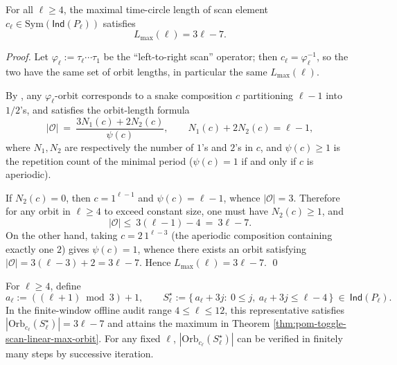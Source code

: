 \begin{theorem}\label{thm:pom-toggle-scan-linear-max-orbit}
For all \(\ell\ge 4\), the maximal time-circle length of scan element \(c_\ell\in\mathrm{Sym}(\mathsf{Ind}(P_\ell))\) satisfies
\[
L_{\max}(\ell)=3\ell-7.
\]
\end{theorem}
\begin{proof}
Let \(\varphi_\ell:=\tau_\ell\cdots\tau_1\) be the ``left-to-right scan'' operator; then \(c_\ell=\varphi_\ell^{-1}\), so the two have the same set of orbit lengths, in particular the same \(L_{\max}(\ell)\).

By \cite[Def.~4.1 \& Prop.~4.3]{JosephRoby2018TogglingIndependentSetsPath}, any \(\varphi_\ell\)-orbit corresponds to a snake composition \(c\) partitioning \(\ell-1\) into \(1/2\)'s, and satisfies the orbit-length formula
\[
|\mathcal O|
\ =\
\frac{3N_1(c)+2N_2(c)}{\psi(c)},
\qquad
N_1(c)+2N_2(c)=\ell-1,
\]
where \(N_1,N_2\) are respectively the number of \(1\)'s and \(2\)'s in \(c\), and \(\psi(c)\ge 1\) is the repetition count of the minimal period (\(\psi(c)=1\) if and only if \(c\) is aperiodic).

If \(N_2(c)=0\), then \(c=1^{\ell-1}\) and \(\psi(c)=\ell-1\), whence \(|\mathcal O|=3\).
Therefore for any orbit in \(\ell\ge 4\) to exceed constant size, one must have \(N_2(c)\ge 1\), and
\[
|\mathcal O|
\le\
3(\ell-1)-4
\ =\
3\ell-7.
\]
On the other hand, taking \(c=2\,1^{\ell-3}\) (the aperiodic composition containing exactly one \(2\)) gives \(\psi(c)=1\), whence there exists an orbit satisfying
\(
|\mathcal O|=3(\ell-3)+2=3\ell-7
\).
Hence \(L_{\max}(\ell)=3\ell-7\). \qed
\end{proof}

\begin{remark}\label{rem:pom-toggle-scan-explicit-long-orbit}
For \(\ell\ge 4\), define
\[
a_\ell:=((\ell+1)\bmod 3)+1,
\qquad
S_\ell^\star:=\{\,a_\ell+3j:\ 0\le j,\ a_\ell+3j\le \ell-4\,\}\ \in\ \mathsf{Ind}(P_\ell).
\]
In the finite-window offline audit range \(4\le \ell\le 12\), this representative satisfies
\(
|\mathrm{Orb}_{c_\ell}(S_\ell^\star)|=3\ell-7
\)
and attains the maximum in Theorem \ref{thm:pom-toggle-scan-linear-max-orbit}.
For any fixed \(\ell\), \(|\mathrm{Orb}_{c_\ell}(S_\ell^\star)|\) can be verified in finitely many steps by successive iteration.
\end{remark}

